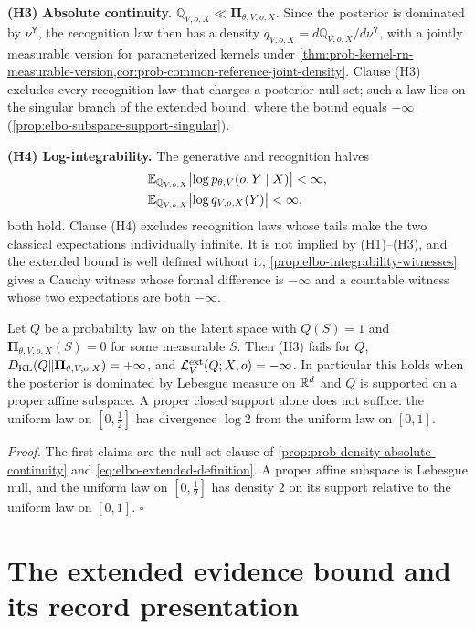 \textbf{(H3) Absolute continuity.}
$\mathbb Q_{V,o,X}\ll\boldsymbol\Pi_{\theta,V,o,X}$. Since the posterior is
dominated by $\nu^{\mathsf Y}$, the recognition law then has a density
$q_{V,o,X}=d\mathbb Q_{V,o,X}/d\nu^{\mathsf Y}$, with a jointly measurable
version for parameterized kernels under
\cref{thm:prob-kernel-rn-measurable-version,cor:prob-common-reference-joint-density}.
Clause (H3) excludes every recognition law that charges a posterior-null set;
such a law lies on the singular branch of the extended bound, where the bound
equals $-\infty$ (\cref{prop:elbo-subspace-support-singular}).

\textbf{(H4) Log-integrability.} The generative and recognition halves
\begin{align}
&\mathbb E_{\mathbb Q_{V,o,X}}\bigl\lvert\log p_{\theta,V}(o,Y\mid X)\bigr\rvert<\infty,
\label{eq:elbo-log-integrability}\\
&\mathbb E_{\mathbb Q_{V,o,X}}\bigl\lvert\log q_{V,o,X}(Y)\bigr\rvert<\infty,
\label{eq:prob-integrability}
\end{align}
both hold. Clause (H4) excludes recognition laws whose tails make the two
classical expectations individually infinite. It is not implied by
(H1)--(H3), and the extended bound is well defined without it;
\cref{prop:elbo-integrability-witnesses} gives a Cauchy witness whose formal
difference is $-\infty$ and a countable witness whose two expectations are
both $-\infty$.

Let $Q$ be a probability law on the latent space with $Q(S)=1$ and
$\boldsymbol\Pi_{\theta,V,o,X}(S)=0$ for some measurable $S$. Then (H3) fails
for $Q$, $D_{\mathrm{KL}}(Q\Vert\boldsymbol\Pi_{\theta,V,o,X})=+\infty$, and
$\mathcal L^{\mathrm{ext}}_V(Q;X,o)=-\infty$. In particular this holds when the
posterior is dominated by Lebesgue measure on $\mathbb R^d$ and $Q$ is supported on a
proper affine subspace. A proper closed support alone does not suffice: the
uniform law on $[0,\tfrac12]$ has divergence $\log2$ from the uniform law on
$[0,1]$. 

\noindent\emph{Proof.}
The first claims are the null-set clause of
\cref{prop:prob-density-absolute-continuity} and
\eqref{eq:elbo-extended-definition}. A proper affine subspace is Lebesgue
null, and the uniform law on $[0,\tfrac12]$ has density $2$ on its support
relative to the uniform law on $[0,1]$. \hfill$\square$

\section{The extended evidence bound and its record presentation}
\label{sec:elbo-identity}
\label{sec:local-interaction-record-model}
\label{sec:local-collective-vfe}


